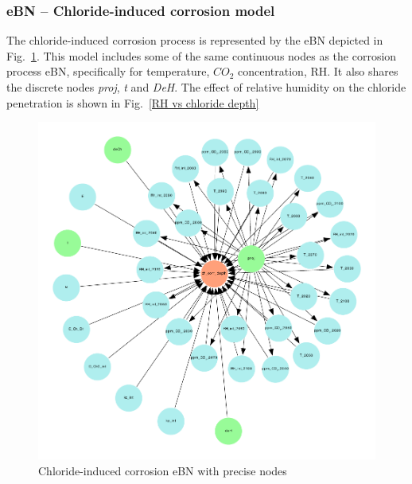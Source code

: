 \subsubsection{eBN -- Chloride-induced corrosion model}\label{ebn_chloride_section}
The chloride-induced corrosion process is represented by the eBN depicted in Fig.~\ref{chloride_ebn}. This model includes some of the same continuous nodes as the corrosion process eBN, specifically for temperature, $CO_2$ concentration, RH. It also shares the  discrete nodes \textit{proj}, \textit{t} and \textit{DeH}. The effect of relative humidity on the chloride penetration is shown in Fig.~\ref{RH vs chloride depth}
\begin{figure}[H]
    \centering
    \includegraphics[width=\linewidth]{imgs/pdfs/9_chloride_ebn.pdf}
    \caption{Chloride-induced corrosion eBN with precise nodes}\label{chloride_ebn}
\end{figure}
